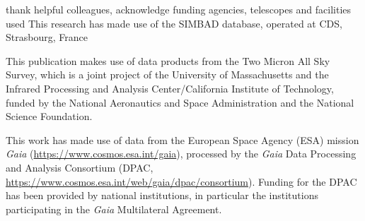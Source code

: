 \documentclass[fleqn,usenatbib,letters]{mnras}%
\begin{document}
thank helpful colleagues, acknowledge funding agencies, telescopes and facilities used
This research has made use of the SIMBAD database,
operated at CDS, Strasbourg, France~\citep{wenger2000}

This publication makes use of data products from the Two Micron All Sky Survey, which is a joint project of the University of Massachusetts and the Infrared Processing and Analysis Center/California Institute of Technology, funded by the National Aeronautics and Space Administration and the National Science Foundation.

This work has made use of data from the European Space Agency (ESA) mission {\it Gaia} (\url{https://www.cosmos.esa.int/gaia}), processed by the {\it Gaia} Data Processing and Analysis Consortium (DPAC, \url{https://www.cosmos.esa.int/web/gaia/dpac/consortium}). Funding for the DPAC has been provided by national institutions, in particular the institutions participating in the {\it Gaia} Multilateral Agreement.










%
%




\bsp	%
\label{lastpage}
\end{document}
